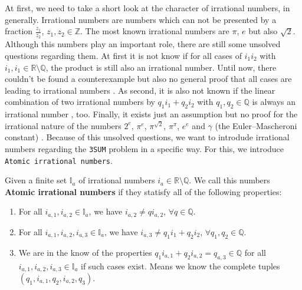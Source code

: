 At first, we need to take a short look at the character of irrational numbers, in generally. Irrational numbers are numbers which can not be presented by a fraction $\frac{z_{1}}{z_{2}}$, $z_{1}, z_{2} \in \mathbb{Z}$. The most known irrational numbers are $\pi$, $e$ but also $\sqrt{2}$. Although this numbers play an important role, there are still some unsolved questions regarding them. At first it is not know if for all cases of $i_{1}i_{2}$ with $i_{1}, i_{1} \in \mathbb{R} \setminus \mathbb{Q}$, the product is still also an irrational number. Until now, there couldn't be found a counterexample but also no general proof that all cases are leading to irrational numbers \cite{Irration5:online}. As second, it is also not known if the linear combination of two irrational numbers by $q_{1} i_{1} + q_{2} i_{2}$ with $q_{1}, q_{2} \in \mathbb{Q}$ is always an irrational number \cite{Irration5:online} \cite{PifromWo5:online}, too. Finally, it exists just an assumption but no proof for the irrational nature of the numbers $2^{e}$, $\pi^{e}$, $\pi^{\sqrt{2}}$, $\pi^{\pi}$, $e^{e}$ and $\gamma$ (the Euler–Mascheroni constant) \cite{Irration5:online}. Because of this unsolved questions, we want to introdude irrational numbers regarding the \texttt{3SUM} problem in a specific way. For this, we introduce \texttt{Atomic irrational numbers}.

\begin{definition}
    Given a finite set $\mathbb{I}_{a}$ of irrational numbers $i_{a} \in \mathbb{R} \setminus \mathbb{Q}$. We call this numbers \textbf{Atomic irrational numbers} if they statisfy all of the following properties:

    \begin{enumerate}
        \item For all $i_{a,1}, i_{a,2} \in \mathbb{I}_{a}$, we have $i_{a,2} \neq q i_{a,2}$, $\forall q \in \mathbb{Q}$.
        \item For all $i_{a,1}, i_{a,2}, i_{a,3} \in \mathbb{I}_{a}$, we have $i_{a,3} \neq q_{1} i_{1} + q_{2} i_{2}$, $\forall q_{1}, q_{2} \in \mathbb{Q}$.
        \item We are in the know of the properties $q_{1} i_{a,1} + q_{2} i_{a,2} = q_{a,3} \in \mathbb{Q}$ for all $i_{a,1}, i_{a,2}, i_{a,3} \in \mathbb{I}_{a}$ if such cases exist. Means we know the complete tuples $\left(q_{1}, i_{a,1}, q_{2}, i_{a,2}, q_{3}\right)$.
    \label{enum:atomicrirationalnumbers}
    \end{enumerate}

\label{def:atomicirrationalnumbers}
\end{definition}

